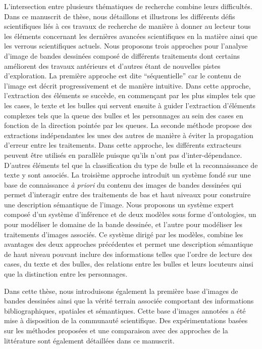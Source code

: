 L'intersection entre plusieurs thématiques de recherche combine leurs difficultés.
Dans ce manuscrit de thèse, nous détaillons et illustrons les différents défis scientifiques liés à ces travaux de recherche de manière à donner au lecteur tous les éléments concernant les dernières avancées scientifiques en la matière ainsi que les verrous scientifiques actuels. 
Nous proposons trois approches pour l'analyse d'image de bandes dessinées composé de différents traitements dont certains améliorent des travaux antérieurs et d'autres étant de nouvelles pistes d'exploration.
La première approche est dite ``séquentielle'' car le contenu de l'image est décrit progressivement et de manière intuitive.
Dans cette approche, l'extraction des éléments se succède, en commençant par les plus simples tels que les cases, le texte et les bulles qui servent ensuite à guider l'extraction d'éléments complexes tels que la queue des bulles et les personnages au sein des cases en fonction de la direction pointée par les queues.
La seconde méthode propose des extractions indépendantes les unes des autres de manière à éviter la propagation d'erreur entre les traitements.
Dans cette approche, les différents extracteurs peuvent être utilisés en parallèle puisque qu'ils n'ont pas d'inter-dépendance.
D'autres éléments tel que la classification du type de bulle et la reconnaissance de texte y sont associés.
La troisième approche introduit un système fondé sur une base de connaissance \emph{à priori} du contenu des images de bandes dessinées qui permet d'interagir entre des traitements de bas et haut niveaux pour construire une description sémantique de l'image.
Nous proposons un système expert composé d'un système d'inférence et de deux modèles sous forme d'ontologies, un pour modéliser le domaine de la bande dessinée, et l'autre pour modéliser les traitements d'images associés.
Ce système dirigé par les modèles, combine les avantages des deux approches précédentes et permet une description sémantique de haut niveau pouvant inclure des informations telles que l'ordre de lecture des cases, du texte et des bulles, des relations entre les bulles  et leurs locuteurs ainsi que la distinction entre les personnages.

Dans cette thèse, nous introduisons également la première base d'images de bandes dessinées ainsi que la vérité terrain associée comportant des informations bibliographiques, spatiales et sémantiques.
Cette base d'images annotées a été mise à disposition de la communauté scientifique.
Des expérimentations basées sur les méthodes proposées et une comparaison avec des approches de la littérature sont également détaillées dans ce manuscrit.



\clearpage\thispagestyle{empty}
